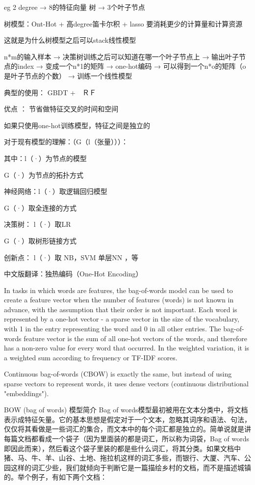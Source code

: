 \documentclass[10pt,a4paper]{ctexbook}
\begin{document}
eg 2 degree → 8的特征向量 树 → 3个叶子节点 

树模型：Ont-Hot + 高degree笛卡尔积 + lasso 要消耗更少的计算量和计算资源 

这就是为什么树模型之后可以stack线性模型 

n*m的输入样本 → 决策树训练之后可以知道在哪一个叶子节点上 → 输出叶子节点的index → 变成一个n*1的矩阵 → one-hot编码 → 可以得到一个n*o的矩阵（o是叶子节点的个数） → 训练一个线性模型 

典型的使用： GBDT +　ＲＦ 

优点 ： 节省做特征交叉的时间和空间 

如果只使用one-hot训练模型，特征之间是独立的 

对于现有模型的理解：（G（l（张量）））： 

其中：l（·）为节点的模型 

G（·）为节点的拓扑方式 

神经网络：l（·）取逻辑回归模型 

G（·）取全连接的方式 

决策树： l（·）取LR 

G（·）取树形链接方式 

创新点： l（·）取 NB，SVM 单层NN ，等 



中文版翻译：独热编码（One-Hot Encoding）


In tasks in which words are features, the bag-of-words model can be used to create a feature vector when the number of features (words) is not known in advance, with the assumption that their order is not important. Each word is represented by a one-hot vector - a sparse vector in the size of the vocabulary, with 1 in the entry representing the word and 0 in all other entries. The bag-of-words feature vector is the sum of all one-hot vectors of the words, and therefore has a non-zero value for every word that occurred. In the weighted variation, it is a weighted sum according to frequency or TF-IDF scores.

Continuous bag-of-words (CBOW) is exactly the same, but instead of using sparse vectors to represent words, it uses dense vectors (continuous distributional "embeddings").




BOW (bag of words) 模型简介 Bag of words模型最初被用在文本分类中，将文档表示成特征矢量。它的基本思想是假定对于一个文本，忽略其词序和语法、句法，仅仅将其看做是一些词汇的集合，而文本中的每个词汇都是独立的。简单说就是讲每篇文档都看成一个袋子（因为里面装的都是词汇，所以称为词袋，Bag of words即因此而来），然后看这个袋子里装的都是些什么词汇，将其分类。如果文档中猪、马、牛、羊、山谷、土地、拖拉机这样的词汇多些，而银行、大厦、汽车、公园这样的词汇少些，我们就倾向于判断它是一篇描绘乡村的文档，而不是描述城镇的。举个例子，有如下两个文档：
\end{document}
